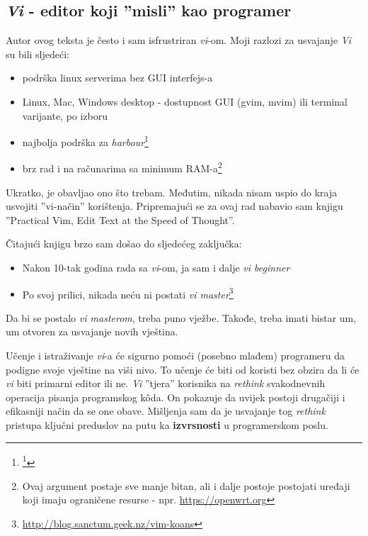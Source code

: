 \documentclass[times, utf8, seminar]{fit}
\begin{document}
\subsection{\emph{Vi} - editor koji ''misli'' kao programer}

\label{sec:vimaster}

Autor ovog teksta je često i sam isfrustriran \emph{vi}-om. Moji razlozi za usvajanje \emph{Vi} su bili sljedeći:
\begin{itemize}
 \item podrška linux serverima bez GUI interfejs-a
 \item Linux, Mac, Windows desktop - dostupnost GUI (gvim, mvim) ili terminal varijante, po izboru 
 \item najbolja podrška za \emph{harbour}\footnote{\footnote{http://en.wikipedia.org/wiki/Harbour_(software)}}
 \item brz rad i na računarima sa minimum RAM-a\footnote{Ovaj argument postaje sve manje bitan, ali i dalje postoje postojati uređaji koji imaju ograničene resurse - npr. \url{https://openwrt.org}}
\end{itemize}

Ukratko,  je obavljao ono što trebam. Međutim, nikada nisam uspio do kraja usvojiti ''vi-način'' korištenja. Pripremajući se za ovaj rad nabavio sam knjigu ''Practical Vim, Edit Text at the Speed of Thought''\citep{pragvim}.

Čitajući knjigu brzo sam došao do sljedećeg zaključka:
\begin{itemize}
  \item Nakon 10-tak godina rada sa \emph{vi}-om, ja sam i dalje \emph{vi beginner} 
  \item Po svoj prilici, nikada neću ni postati \emph{vi master}\footnote{\url{http://blog.sanctum.geek.nz/vim-koans}}
\end{itemize}

Da bi se postalo \emph{vi masterom}, treba puno vježbe. Takođe, treba imati bistar um, um otvoren za usvajanje novih vještina. 

Učenje i istraživanje \emph{vi}-a će sigurno pomoći (posebno mlađem) programeru da podigne svoje vještine na viši nivo. To učenje će biti od koristi bez obzira da li će \emph{vi} biti primarni editor ili ne. \emph{Vi} ''tjera'' korisnika na \emph{rethink} svakodnevnih operacija pisanja programskog k\^oda. On pokazuje da uvijek postoji drugačiji i efikasniji način da se one obave. Mišljenja sam da je usvajanje tog \emph{rethink} pristupa ključni preduslov na putu ka \textbf{izvrsnosti} u programerskom poslu.
\end{document}
